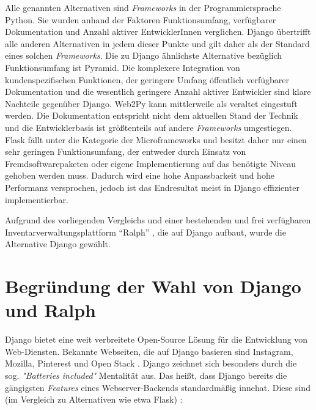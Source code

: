 Alle genannten Alternativen sind
\emph{Frameworks}
in der Programmiersprache Python. Sie wurden anhand der Faktoren
Funktionsumfang, verfügbarer Dokumentation und Anzahl aktiver
EntwicklerInnen verglichen. Django übertrifft alle anderen Alternativen
in jedem dieser Punkte und gilt daher als der Standard eines solchen
\emph{Frameworks}.
Die zu Django ähnlichste Alternative bezüglich Funktionsumfang ist
Pyramid. Die komplexere Integration von kundenspezifischen Funktionen,
der geringere Umfang öffentlich verfügbarer Dokumentation und die
wesentlich geringere Anzahl aktiver Entwickler sind klare Nachteile
gegenüber Django. Web2Py kann mittlerweile als veraltet eingestuft
werden. Die Dokumentation entspricht nicht dem aktuellen Stand der
Technik und die Entwicklerbasis ist größtenteils auf andere
\emph{Frameworks}
umgestiegen. Flask fällt unter die Kategorie der Microframeworks und
besitzt daher nur einen sehr geringen Funktionsumfang, der entweder
durch Einsatz von Fremdsoftwarepaketen oder eigene Implementierung auf
das benötigte Niveau gehoben werden muss. Dadurch wird eine hohe
Anpassbarkeit und hohe Performanz versprochen, jedoch ist das
Endresultat meist in Django effizienter implementierbar.

Aufgrund des vorliegenden Vergleichs und einer bestehenden und frei
verfügbaren Inventarverwaltungsplattform ``Ralph'' \cite{ralph}, die auf
Django aufbaut, wurde die Alternative Django gewählt.

\hypertarget{begruxfcndung-der-wahl-von-django-und-ralph}{%
\section{Begründung der Wahl von Django und
Ralph}\label{begruxfcndung-der-wahl-von-django-und-ralph}}

Django bietet eine weit verbreitete Open-Source Lösung für die
Entwicklung von Web-Diensten. Bekannte Webseiten, die auf Django
basieren sind \ua{} Instagram, Mozilla, Pinterest und Open Stack
\cite{django-overview}. Django zeichnet sich besonders durch die sog.
\emph{"Batteries included"}
Mentalität aus. Das heißt, dass Django bereits die gängigsten
\emph{Features}
eines Webserver-Backends standardmäßig innehat. Diese sind (im Vergleich
zu Alternativen wie etwa Flask) \ua{}:

